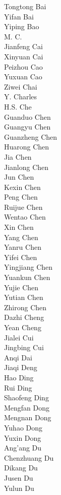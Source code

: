 Tongtong Bai\\
Yifan Bai\\
Yiping Bao\\
M. C.\\
Jianfeng Cai\\
Xinyuan Cai\\
Peizhou Cao\\
Yuxuan Cao\\
Ziwei Chai\\
Y. Charles\\
H.S. Che\\
Guanduo Chen\\
Guangyu Chen\\
Guanzheng Chen\\
Huarong Chen\\
Jia Chen\\
Jianlong Chen\\
Jun Chen\\
Kexin Chen\\
Peng Chen\\
Ruijue Chen\\
Wentao Chen\\
Xin Chen\\
Yang Chen\\
Yanru Chen\\
Yifei Chen\\
Yingjiang Chen\\
Yuankun Chen\\
Yujie Chen\\
Yutian Chen\\
Zhirong Chen\\
Dazhi Cheng\\
Yean Cheng\\
Jialei Cui\\
Jingbing Cui\\
Anqi Dai\\
Jiaqi Deng\\
Hao Ding\\
Rui Ding\\
Shaofeng Ding\\
Mengfan Dong\\
Mengnan Dong\\
Yuhao Dong\\
Yuxin Dong\\
Ang'ang Du\\
Chenzhuang Du\\
Dikang Du\\
Jusen Du\\
Yulun Du\\
